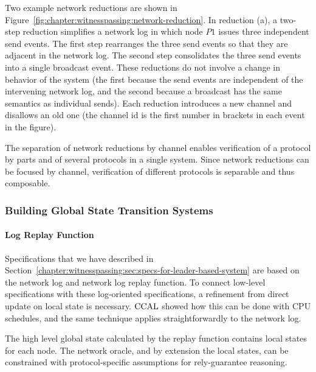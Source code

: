 Two example network reductions are shown in Figure~\ref{fig:chapter:witnesspassing:network-reduction}. In
reduction (a), a two-step reduction simplifies a network log in which node $P1$
issues three independent send events. The first step rearranges the three send
events so that they are adjacent in the network log. The second step
consolidates the three send events into a single broadcast event. These
reductions do not involve a change in behavior of the system (the first because
the send events are independent of the intervening network log, and the second
because a broadcast has the same semantics as individual sends). Each reduction
introduces a new channel and disallows an old one (the channel id is the first
number in brackets in each event in the figure).

The separation of network reductions by channel enables verification of a
protocol by parts and of several protocols in a single system. Since network
reductions can be focused by channel, verification of different protocols is
separable and thus composable.


\subsubsection{Building Global State Transition Systems}

\paragraph{Log Replay Function}
Specifications that we have described in
 Section~\ref{chapter:witnesspassing:sec:specs-for-leader-based-system}
 are based on the network log and network
log replay function. To connect low-level specifications with these log-oriented
specifications, a refinement from direct update on local state is necessary. 
 $\mathrm{CCAL}$  showed how this can
be done with CPU schedules, and the same technique applies straightforwardly to
the network log.

The high level global state calculated by the replay function contains local
states for each node. The network oracle, and by extension the local states, can
be constrained with protocol-specific assumptions for rely-guarantee reasoning.
